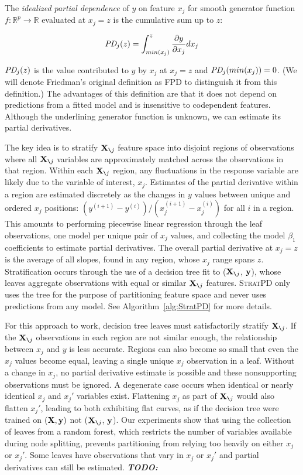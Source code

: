 \documentclass{article}
\newcommand{\algref}[1]{Algorithm~\ref{#1}}
\newcommand{\todo}[1]{{\bf\em TODO:} {{\color{red}{#1}}}}
\newcommand{\spd}{\fontfamily{cmr}\textsc{\small StratPD}}
\newcommand{\xnj}{${\bf X}_{\texttt{\char`\\}j}$}
\newcommand{\yi}{y^{(i)}}
\begin{document}
 The {\em idealized partial dependence} of $y$ on feature $x_j$ for smooth generator function $f:\mathbb{R}^{p} \rightarrow \mathbb{R}$ evaluated at $x_j = z$ is the cumulative sum up to $z$:

\begin{equation}\label{eq:pd}
\text{\it PD}_j(z) = \int_{min(x_j)}^z \frac{\partial y}{\partial x_j} dx_j
\end{equation}

$\text{\it PD}_j(z)$ is the value contributed to $y$ by $x_j$ at $x_j = z$ and $\text{\it PD}_j(min(x_j))=0$. (We will denote Friedman's original definition as FPD to distinguish it from this definition.) The advantages of this definition are that it does not depend on predictions from a fitted model and is insensitive to codependent features.  Although the underlining generator function is unknown, we can estimate its partial derivatives.

The key idea is to stratify \xnj{} feature space into disjoint regions of observations where all \xnj{} variables are approximately matched across the observations in that region. Within each \xnj{} region, any fluctuations in the response variable are likely due to the variable of interest, $x_j$.  Estimates of the partial derivative within a region are estimated discretely as the changes in $y$ values between unique and ordered $x_j$ positions:  $(y^{(i+1)} - \yi)/(x_j^{(i+1)} - x_j^{(i)})$ for all $i$ in a region.  This amounts to performing piecewise linear regression through the leaf observations, one model per unique pair of $x_j$ values, and collecting the model $\beta_1$ coefficients to estimate partial derivatives. The overall partial derivative at $x_j=z$ is the average of all slopes, found in any region, whose $x_j$ range spans $z$.  Stratification occurs through the use of a decision tree fit to (\xnj, $\bf y$), whose leaves aggregate observations with equal or similar \xnj{} features. \spd{} only uses the tree for the purpose of partitioning feature space and never uses predictions from any model. See \algref{alg:StratPD} for more details.

For this approach to work, decision tree leaves must satisfactorily stratify \xnj{}. If the \xnj{} observations in each region are not similar enough, the relationship between $x_j$ and $y$   is less accurate.  Regions can also become so small that even the $x_j$ values become equal, leaving a single unique $x_j$ observation in a leaf. Without a change in $x_j$, no partial derivative estimate is possible and these nonsupporting observations must be  ignored. A degenerate case occurs when identical or nearly identical $x_j$ and $x_j'$ variables exist. Flattening $x_j$ as part of \xnj{} would also flatten $x_j'$, leading to both exhibiting flat curves, as if the decision tree were trained on $(\bf X, y)$ not (\xnj, $\bf y$). Our experiments show that using the collection of leaves from a random forest, which restricts the number of variables available during node splitting, prevents partitioning from relying too heavily on either $x_j$ or $x_j'$. Some leaves have observations that vary in $x_j$ or $x_j'$ and partial derivatives can still be estimated. \todo{maybe talk about how PD/ICE on RF underestimates the curve.}
\end{document}
